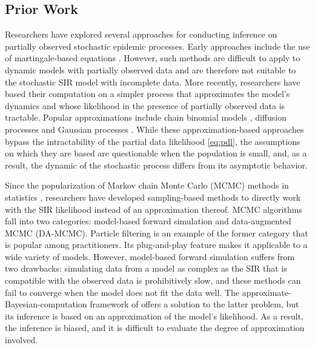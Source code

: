 \documentclass[11pt]{article}
\begin{document}
	\subsection{Prior Work}
	\label{sec:pre}
	Researchers have explored several approaches for conducting inference on partially observed stochastic epidemic processes. Early approaches include the use of martingale-based equations \cite{Becker.1977, Watson.1981, Sudbury.1985}. However, such methods are difficult to apply to dynamic models with partially observed data and are therefore not suitable to the stochastic SIR model with incomplete data.
	More recently, researchers have based their computation on a simpler process that approximates the model's dynamics and whose likelihood in the presence of partially observed data is tractable. Popular approximations include chain binomial models \cite{Greenwood.1931, Abbey.1952}, diffusion processes \cite{Cauchemez.2008, Fintzi.2020} and Gaussian processes \cite{Jandarov.2014}. While these approximation-based approaches bypass the intractability of the partial data likelihood \eqref{eq:pdl}, the assumptions on which they are based are questionable when the population is small, and, as a result, the dynamic of the stochastic process differs from its asymptotic behavior.
	
	Since the popularization of Markov chain Monte Carlo (MCMC) methods in statistics \cite{Tanner.1987, Gelfand.1990, Tierney.1994}, researchers have developed sampling-based methods to directly work with the SIR likelihood instead of an approximation thereof. MCMC algorithms fall into two categories: model-based forward simulation and data-augmented MCMC (DA-MCMC).
	Particle filtering \cite{King.2015} is an example of the former category that is popular among practitioners. Its plug-and-play feature makes it applicable to a wide variety of models. However, model-based forward simulation suffers from two drawbacks: simulating data from a model as complex as the SIR that is compatible with the observed data is prohibitively slow, and these methods can fail to converge when the model does not fit the data well. The approximate-Bayesian-computation framework of \cite{McKinley.2018} offers a solution to the latter problem, but its inference is based on an approximation of the model's likelihood. As a result, the inference is biased, and it is difficult to evaluate the degree of approximation involved. %
	
\end{document}
